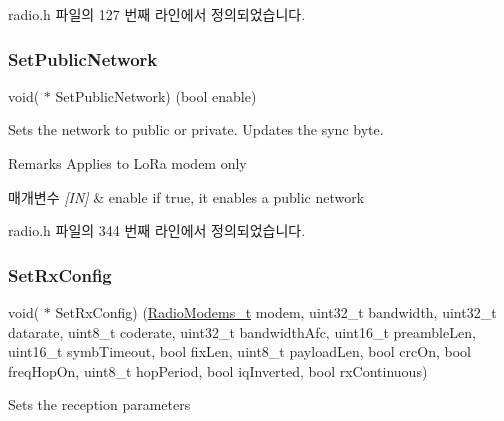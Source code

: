 radio.\+h 파일의 127 번째 라인에서 정의되었습니다.

\mbox{\label{struct_radio__s_a2221e3fed07a50bc7437d1204a04a7ec}} 
\subsubsection{\texorpdfstring{Set\+Public\+Network}{SetPublicNetwork}}
{\footnotesize\ttfamily void( $\ast$ Set\+Public\+Network) (bool enable)}



Sets the network to public or private. Updates the sync byte. 

\begin{DoxyRemark}{Remarks}
Applies to Lo\+Ra modem only
\end{DoxyRemark}

\begin{DoxyParams}{매개변수}
{\em \mbox{[}\+I\+N\mbox{]}} & enable if true, it enables a public network \\
\hline
\end{DoxyParams}


radio.\+h 파일의 344 번째 라인에서 정의되었습니다.

\mbox{\label{struct_radio__s_ae4e2616b2534ce84bf4110dc6d31f82f}} 
\subsubsection{\texorpdfstring{Set\+Rx\+Config}{SetRxConfig}}
{\footnotesize\ttfamily void( $\ast$ Set\+Rx\+Config) (\mbox{\hyperlink{radio_8h_a992ef7a5b7f52975ba7bd8dd97740057}{Radio\+Modems\+\_\+t}} modem, uint32\+\_\+t bandwidth, uint32\+\_\+t datarate, uint8\+\_\+t coderate, uint32\+\_\+t bandwidth\+Afc, uint16\+\_\+t preamble\+Len, uint16\+\_\+t symb\+Timeout, bool fix\+Len, uint8\+\_\+t payload\+Len, bool crc\+On, bool freq\+Hop\+On, uint8\+\_\+t hop\+Period, bool iq\+Inverted, bool rx\+Continuous)}



Sets the reception parameters 



